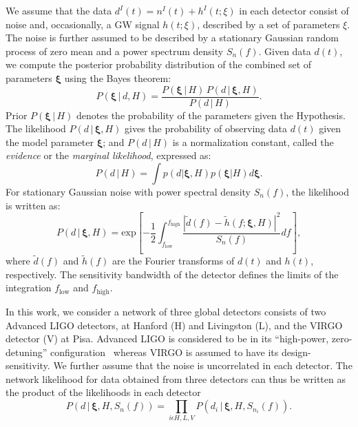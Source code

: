 \documentclass[prd,preprintnumbers,twocolumn,eqsecnum,floatfix,a4paper,nofootinbib,superscriptaddress]{revtex4}
\newcommand{\bxi}{\bm{\xi}}
\begin{document}
We assume that the data $d^I(t) = n^I(t) + h^I(t;\xi)$ in each detector consist of noise and, occasionally, a GW signal $h(t;\xi)$, described by a set of parameters $\xi$. The noise is further assumed to be described by a stationary Gaussian random process of zero mean and a power spectrum density $S_n(f)$. Given data $d(t)$, we compute the posterior probability distribution of the combined set of parameters ${\bxi}$ using the Bayes theorem: 
\begin{equation}
P({\bxi} \, | \, d, H) = \frac{P({\bxi} \, | \, H) \, P (d \, | \, {\bxi}, H)}{P(d \, | \, H)}.
\label{eq:Bayes_theorem}
\end{equation} 
Prior $P({\bxi} \, | \, H)$ denotes the probability of the parameters given the Hypothesis.  The likelihood $P (d \, | \, {\bxi}, H)$ gives the probability of observing data $d(t)$ given the model parameter $\bxi$; and $P(d \, | \, H)$ is a normalization constant, called the \emph{evidence} or the \emph{marginal likelihood}, expressed as:
 \begin{equation}
 P(d \, | \, H)=\int p(d|\bxi, H)p(\bxi | H)d\bxi.
 \label{eq:evidence}
 \end{equation}
For stationary Gaussian noise with power spectral density $S_n(f)$, the likelihood is written as:
\begin{equation}
P (d \, | \, {\bxi}, H) = \text{exp}\left[ -\frac{1}{2}\int_{f_\mathrm{low}}^{f_\mathrm{high}} \frac{|\tilde{d}(f) - \tilde{h}(f;{\bxi}, H)|^2}{S_n(f)}df\right],
\end{equation}
where $\tilde{d}(f)$ and $\tilde{h}(f)$ are the Fourier transforms of $d(t)$ and $h(t)$, respectively. The sensitivity bandwidth of the detector defines the limits of the integration $f_\mathrm{low}$ and $f_\mathrm{high}$. 

In this work, we consider a network of three global detectors consists of two Advanced LIGO detectors, at Hanford (H) and Livingston (L), and the VIRGO detector (V) at Pisa. Advanced LIGO is considered to be in its ``high-power, zero-detuning'' configuration~\cite{aLIGOZeroDetHighPower} whereas VIRGO is assumed to have its design-sensitivity. We further assume that the noise is uncorrelated in each detector. The network likelihood for data obtained from three detectors can thus be written as the product of the likelihoods in each detector
\begin{equation}
P (d \, | \, {\bxi}, H, S_n(f)) = \prod_{i \epsilon {H,L,V}} P (d_{i} \, | \, {\bxi}, H, S_{n_{i}}(f)).
\end{equation}
\end{document}
